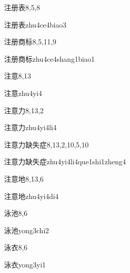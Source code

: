 \begin{entry}{注册表}{8,5,8}
  \begin{phonetics}{注册表}{zhu4ce4biao3}
  \end{phonetics}
\end{entry}

\begin{entry}{注册商标}{8,5,11,9}
  \begin{phonetics}{注册商标}{zhu4ce4shang1biao1}
  \end{phonetics}
\end{entry}

\begin{entry}{注意}{8,13}
  \begin{phonetics}{注意}{zhu4yi4}
  \end{phonetics}
\end{entry}

\begin{entry}{注意力}{8,13,2}
  \begin{phonetics}{注意力}{zhu4yi4li4}
  \end{phonetics}
\end{entry}

\begin{entry}{注意力缺失症}{8,13,2,10,5,10}
  \begin{phonetics}{注意力缺失症}{zhu4yi4li4que1shi1zheng4}
  \end{phonetics}
\end{entry}

\begin{entry}{注意地}{8,13,6}
  \begin{phonetics}{注意地}{zhu4yi4di4}
  \end{phonetics}
\end{entry}

\begin{entry}{泳池}{8,6}
  \begin{phonetics}{泳池}{yong3chi2}
  \end{phonetics}
\end{entry}

\begin{entry}{泳衣}{8,6}
  \begin{phonetics}{泳衣}{yong3yi1}
  \end{phonetics}
\end{entry}

